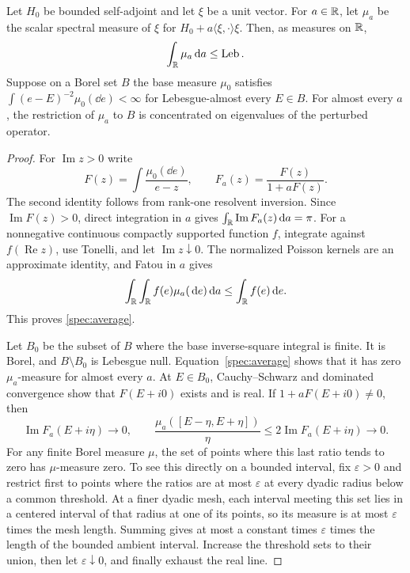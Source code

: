 \begin{lemma}\label{spec:averaging}
Let $H_0$ be bounded self-adjoint and let $\xi$ be a unit vector.
For $a\in\mathbb R$, let $\mu_a$ be the scalar spectral measure of $\xi$
for $H_0+a\langle\xi,\cdot\rangle\xi$. Then, as measures on $\mathbb R$,
\begin{equation}\label{spec:average}
 \int_\mathbb R\mu_a\,\mathrm d a\le \operatorname{Leb}.
\end{equation}
Suppose on a Borel set $B$ the base measure $\mu_0$ satisfies
$\int(e-E)^{-2}\mu_0(\dd e)<\infty$ for Lebesgue-almost every
$E\in B$. For almost every $a$, the restriction of $\mu_a$ to $B$
is concentrated on eigenvalues of the perturbed operator.
\end{lemma}

\begin{proof}
For $\operatorname{Im}z>0$ write
\[
 F(z)=\int\frac{\mu_0(\dd e)}{e-z},\qquad
 F_a(z)=\frac{F(z)}{1+aF(z)}.
\]
The second identity follows from rank-one resolvent inversion. Since
$\operatorname{Im}F(z)>0$, direct integration in $a$ gives
$\int_\mathbb R\operatorname{Im}F_a(z)\,\mathrm d a=\pi$.
For a nonnegative continuous compactly supported function $f$, integrate
against $f(\operatorname{Re}z)$, use Tonelli, and let
$\operatorname{Im}z\downarrow0$. The normalized Poisson kernels are an
approximate identity, and Fatou in $a$ gives
\[
 \int_\mathbb R\int_\mathbb R f(e)\mu_a(\,\mathrm d e)\,\mathrm d a
 \le\int_\mathbb R f(e)\,\mathrm d e.
\]
This proves \cref{spec:average}.

Let $B_0$ be the subset of $B$ where the base inverse-square integral
is finite. It is Borel, and $B\setminus B_0$ is Lebesgue null.
Equation~\eqref{spec:average} shows that it has zero $\mu_a$-measure
for almost every $a$. At $E\in B_0$, Cauchy--Schwarz and dominated
convergence show that $F(E+i0)$ exists and is real. If
$1+aF(E+i0)\ne0$, then
\[
 \operatorname{Im}F_a(E+i\eta)\longrightarrow0,
 \qquad
 \frac{\mu_a([E-\eta,E+\eta])}{\eta}
 \le2\operatorname{Im}F_a(E+i\eta)\longrightarrow0.
\]
For any finite Borel measure $\mu$, the set of points where this last
ratio tends to zero has $\mu$-measure zero. To see this directly on a
bounded interval, fix $\varepsilon>0$ and restrict first to points where
the ratios are at most $\varepsilon$ at every dyadic radius below a
common threshold. At a finer dyadic mesh, each interval meeting this
set lies in a centered interval of that radius at one of its points,
so its measure is at most $\varepsilon$ times the mesh length. Summing
gives at most a constant times $\varepsilon$ times the length of the
bounded ambient interval. Increase the threshold sets to their union,
then let $\varepsilon\downarrow0$, and finally exhaust the real line.


\end{proof}
